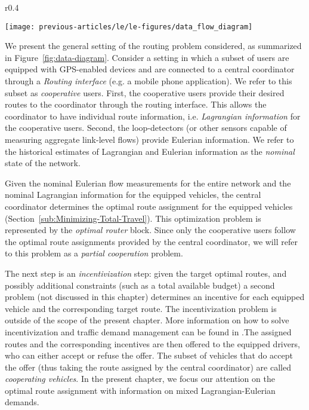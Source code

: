\begin{wrapfigure}{r}{0.4\columnwidth}%
\begin{centering}
\texttt{[image: previous-articles/le/le-figures/data\_flow\_diagram]}
\par\end{centering}

\protect\caption[Data-flow diagram for the partial compliance routing problem.]{Data-flow diagram\label{fig:data-diagram}}
\end{wrapfigure}%
We present the general setting of the routing problem considered,
as summarized in Figure~\ref{fig:data-diagram}. Consider a setting
in which a subset of users are equipped with GPS-enabled devices and
are connected to a central coordinator through a \emph{Routing interface}
(e.g. a mobile phone application). We refer to this subset as \emph{cooperative
}users. First, the cooperative users provide their desired routes
to the coordinator through the routing interface. This allows the
coordinator to have individual route information, i.e. \emph{Lagrangian
information} for the cooperative users. Second, the loop-detectors
(or other sensors capable of measuring aggregate link-level flows)
provide Eulerian information. We refer to the historical estimates
of Lagrangian and Eulerian information as the \emph{nominal} state
of the network.

Given the nominal Eulerian flow measurements for the entire network
and the nominal Lagrangian information for the equipped vehicles,
the central coordinator determines the optimal route assignment for
the equipped vehicles (Section~\ref{sub:Minimizing-Total-Travel}).
This optimization problem is represented by the \emph{optimal router}
block. Since only the cooperative users follow the optimal route assignments
provided by the central coordinator, we will refer to this problem
as a \emph{partial cooperation} problem.

The next step is an \emph{incentivization} step: given the target
optimal routes, and possibly additional constraints (such as a total
available budget) a second problem (not discussed in this chapter)
determines an incentive for each equipped vehicle and the corresponding
target route. The incentivization problem is outside of the scope
of the present chapter. More information on how to solve incentivization
and traffic demand management can be found in \cite{romain2012}.The
assigned routes and the corresponding incentives are then offered
to the equipped drivers, who can either accept or refuse the offer.
The subset of vehicles that do accept the offer (thus taking the route
assigned by the central coordinator) are called \emph{cooperating
vehicles}. In the present chapter, we focus our attention on the optimal
route assignment with information on mixed Lagrangian-Eulerian demands.

